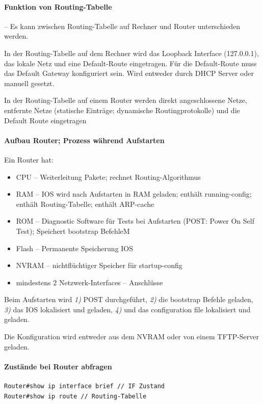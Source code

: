 \documentclass[a4paper,12pt]{article}
\begin{document}
\paragraph{Funktion von Routing-Tabelle} -- Es kann zwischen Routing-Tabelle auf Rechner und Router unterschieden werden. 

In der Routing-Tabelle auf dem Rechner wird das Loopback Interface (127.0.0.1), das lokale Netz und eine Default-Route eingetragen. Für die Default-Route muss das Default Gateway konfiguriert sein. Wird entweder durch DHCP Server oder manuell gesetzt.
 
In der Routing-Tabelle auf einem Router werden direkt angeschlossene Netze, entfernte Netze (statische Einträge; dynamische Routingprotokolle) und die Default Route eingetragen





\paragraph{Aufbau Router; Prozess während Aufstarten}
Ein Router hat:
\begin{itemize}
\item CPU -- Weiterleitung Pakete; rechnet Routing-Algorithmus
\item RAM -- IOS wird nach Aufstarten in RAM geladen; enthält running-config; enthält Routing-Tabelle; enthält ARP-cache
\item ROM -- Diagnostic Software für Tests bei Aufstarten (POST: Power On Self Test); Speichert bootstrap BefehleM
\item Flash -- Permanente Speicherung IOS
\item NVRAM -- nichtflüchtiger Speicher für startup-config
\item mindestens 2 Netzwerk-Interfaces -- Anschlüsse
\end{itemize}

Beim Aufstarten wird \emph{1)} POST durchgeführt, \emph{2)} die bootstrap Befehle geladen, \emph{3)} das IOS lokalisiert und geladen, \emph{4)} und das configuration file lokalisiert und geladen.

Die Konfiguration wird entweder aus dem NVRAM oder von einem TFTP-Server geladen.



\paragraph{Zustände bei Router abfragen}
\begin{lstlisting}
Router#show ip interface brief // IF Zustand
Router#show ip route // Routing-Tabelle
\end{lstlisting}
\end{document}
